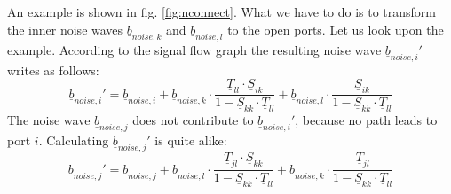 \documentclass[10pt]{report}
\begin{document}
An example is shown in fig. \ref{fig:nconnect}.  What we have to do is
to transform the inner noise waves $\underline{b}_{noise,k}$ and
$\underline{b}_{noise,l}$ to the open ports.  Let us look upon the
example.  According to the signal flow graph the resulting noise wave
$\underline{b}_{noise,i}'$ writes as follows:
\begin{equation}
\underline{b}_{noise,i}' = \underline{b}_{noise,i} +
    \underline{b}_{noise,k}\cdot
            \frac{\underline{T}_{ll}\cdot \underline{S}_{ik}}{1-\underline{S}_{kk}\cdot\underline{T}_{ll}} +
    \underline{b}_{noise,l}\cdot
            \frac{\underline{S}_{ik}}{1-\underline{S}_{kk}\cdot\underline{T}_{ll}}
\label{eq:bnoiseI}
\end{equation}
The noise wave $\underline{b}_{noise,j}$ does not contribute to
$\underline{b}_{noise,i}'$, because no path leads to port $i$.
Calculating $\underline{b}_{noise,j}'$ is quite alike:
\begin{equation}
\underline{b}_{noise,j}' = \underline{b}_{noise,j} +
    \underline{b}_{noise,l}\cdot
            \frac{\underline{T}_{jl}\cdot \underline{S}_{kk}}{1-\underline{S}_{kk}\cdot\underline{T}_{ll}} +
    \underline{b}_{noise,k}\cdot
            \frac{\underline{T}_{jl}}{1-\underline{S}_{kk}\cdot\underline{T}_{ll}}
\label{eq:bnoiseJ}
\end{equation}
\end{document}
